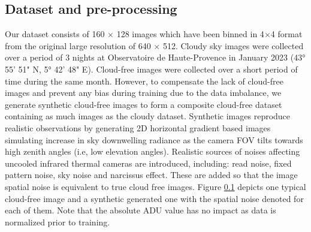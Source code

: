 \documentclass{article}
\begin{document}



\subsection{Dataset and pre-processing}

Our dataset consists of 160 $\times$ 128 images which have been binned in 4$\times$4 format from the original large resolution of 640 $\times$ 512. Cloudy sky images were collected over a period of 3 nights at Observatoire de Haute-Provence in January 2023 (43° 55' 51" N, 5° 42' 48" E). Cloud-free images were collected over a short period of time during the same month. However, to compensate the lack of cloud-free images and prevent any bias during training due to the data imbalance, we generate synthetic cloud-free images to form a composite cloud-free dataset containing as much images as the cloudy dataset. Synthetic images reproduce realistic observations by generating 2D horizontal gradient based images simulating increase in sky downwelling radiance as the camera FOV tilts towards high zenith angles (i.e, low elevation angles). Realistic sources of noises affecting uncooled infrared thermal cameras are introduced, including: read noise, fixed pattern noise, sky noise and narcissus effect. These are added so that the image spatial noise is equivalent to true cloud free images. Figure \ref{} depicts one typical cloud-free image and a synthetic generated one with the spatial noise denoted for each of them. Note that the absolute ADU value has no impact as data is normalized prior to training.
\end{document}
